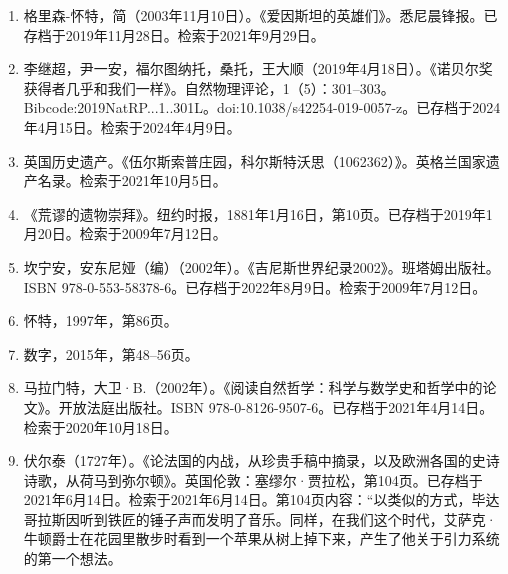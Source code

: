 \begin{enumerate}
\item 格里森-怀特，简（2003年11月10日）。《爱因斯坦的英雄们》。悉尼晨锋报。已存档于2019年11月28日。检索于2021年9月29日。
\item 李继超，尹一安，福尔图纳托，桑托，王大顺（2019年4月18日）。《诺贝尔奖获得者几乎和我们一样》。自然物理评论，1（5）：301–303。Bibcode:2019NatRP...1..301L。doi:10.1038/s42254-019-0057-z。已存档于2024年4月15日。检索于2024年4月9日。  
\item 英国历史遗产。《伍尔斯索普庄园，科尔斯特沃思（1062362）》。英格兰国家遗产名录。检索于2021年10月5日。  
\item 《荒谬的遗物崇拜》。纽约时报，1881年1月16日，第10页。已存档于2019年1月20日。检索于2009年7月12日。  
\item 坎宁安，安东尼娅（编）（2002年）。《吉尼斯世界纪录2002》。班塔姆出版社。ISBN 978-0-553-58378-6。已存档于2022年8月9日。检索于2009年7月12日。
\item 怀特，1997年，第86页。  
\item 数字，2015年，第48–56页。  
\item 马拉门特，大卫·B.（2002年）。《阅读自然哲学：科学与数学史和哲学中的论文》。开放法庭出版社。ISBN 978-0-8126-9507-6。已存档于2021年4月14日。检索于2020年10月18日。  
\item 伏尔泰（1727年）。《论法国的内战，从珍贵手稿中摘录，以及欧洲各国的史诗诗歌，从荷马到弥尔顿》。英国伦敦：塞缪尔·贾拉松，第104页。已存档于2021年6月14日。检索于2021年6月14日。第104页内容：“以类似的方式，毕达哥拉斯因听到铁匠的锤子声而发明了音乐。同样，在我们这个时代，艾萨克·牛顿爵士在花园里散步时看到一个苹果从树上掉下来，产生了他关于引力系统的第一个想法。




\end{enumerate}
